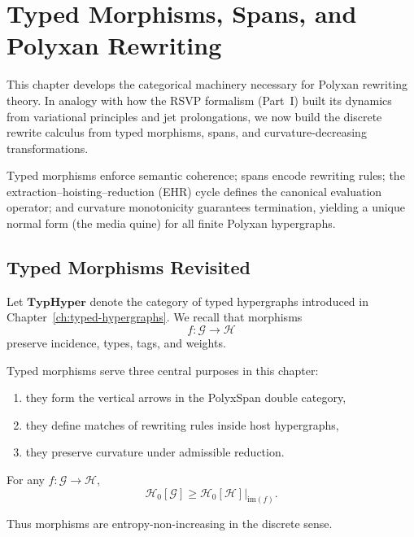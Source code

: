 \chapter{Typed Morphisms, Spans, and Polyxan Rewriting}
\label{ch:typed-morphisms}

This chapter develops the categorical machinery necessary for Polyxan
rewriting theory.  In analogy with how the RSVP formalism (Part~I)
built its dynamics from variational principles and jet prolongations,
we now build the discrete rewrite calculus from typed morphisms, spans,
and curvature-decreasing transformations.

Typed morphisms enforce semantic coherence; spans encode rewriting rules;
the extraction–hoisting–reduction (EHR) cycle defines the canonical
evaluation operator; and curvature monotonicity guarantees termination,
yielding a unique normal form (the media quine) for all finite Polyxan
hypergraphs.

\section{Typed Morphisms Revisited}

Let $\mathbf{TypHyper}$ denote the category of typed hypergraphs introduced
in Chapter~\ref{ch:typed-hypergraphs}.  We recall that morphisms
\[
f: \mathcal{G} \to \mathcal{H}
\]
preserve incidence, types, tags, and weights.

Typed morphisms serve three central purposes in this chapter:
\begin{enumerate}
\item they form the vertical arrows in the PolyxSpan double category,
\item they define matches of rewriting rules inside host hypergraphs,
\item they preserve curvature under admissible reduction.
\end{enumerate}

\begin{proposition}
For any $f : \mathcal{G} \to \mathcal{H}$,
\[
\mathcal{H}_0[\mathcal{G}] \ge \mathcal{H}_0[\mathcal{H}]|_{\mathrm{im}(f)}.
\]
\end{proposition}

Thus morphisms are entropy-non-increasing in the discrete sense.

